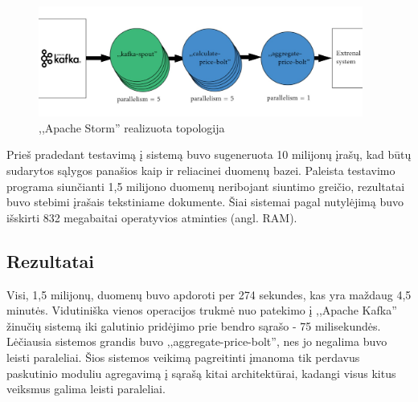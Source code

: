 \documentclass{VUMIFPSkursinis}
\begin{document}
\begin{figure}[!htbp]
    \centering
    \includegraphics[width=0.95\textwidth]{img/topology2.jpg}
    \caption{,,Apache Storm'' realizuota topologija}
    \label{fig:stormtopology}
\end{figure}
Prieš pradedant testavimą į sistemą buvo sugeneruota 10 milijonų įrašų, kad būtų sudarytos sąlygos panašios kaip ir reliacinei duomenų bazei.
Paleista testavimo programa siunčianti 1,5 milijono duomenų neribojant siuntimo greičio, rezultatai buvo stebimi įrašais tekstiniame dokumente.
Šiai sistemai pagal nutylėjimą buvo išskirti 832 megabaitai operatyvios atminties (angl. RAM). 
\subsection{Rezultatai}
Visi, 1,5 milijonų, duomenų buvo apdoroti per 274 sekundes, kas yra maždaug 4,5 minutės. Vidutiniška vienos operacijos trukmė nuo 
patekimo į ,,Apache Kafka'' žinučių sistemą iki galutinio pridėjimo prie bendro sąrašo - 75 milisekundės.
Lėčiausia sistemos grandis buvo ,,aggregate-price-bolt'', nes jo negalima buvo leisti paraleliai. Šios sistemos veikimą pagreitinti 
įmanoma tik perdavus paskutinio moduliu agregavimą į sąrašą kitai architektūrai, kadangi visus kitus veiksmus galima leisti paraleliai.




\end{document}
